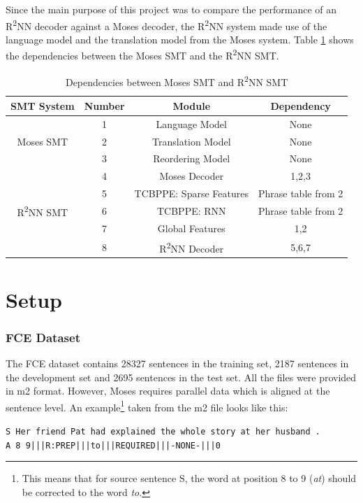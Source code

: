 \documentclass[12pt,a4paper,twoside]{report}
\begin{document}
Since the main purpose of this project was to compare the performance of an R\textsuperscript{2}NN decoder against a Moses decoder, the R\textsuperscript{2}NN system made use of the language model and the translation model from the Moses system. Table \ref{table:dependency} shows the dependencies between the Moses SMT and the R\textsuperscript{2}NN SMT.

\begin{table}[ht]
\centering
\vspace*{3mm}
\begin{tabular}{ c|c|c|c }
    \hline
    SMT System & Number & Module & Dependency \\
    \hline
    \multirow{3}{3em}{Moses SMT} & 1 & Language Model & None \\
    & 2 & Translation Model & None \\
    & 3 & Reordering Model & None \\
    & 4 & Moses Decoder & 1,2,3 \\
    \hline
    \multirow{3}{3em}{R\textsuperscript{2}NN SMT} & 5 & TCBPPE: Sparse Features & Phrase table from 2 \\
    & 6 & TCBPPE: RNN & Phrase table from 2 \\
    & 7 & Global Features & 1,2 \\
    & 8 & R\textsuperscript{2}NN Decoder & 5,6,7 \\
    \hline
\end{tabular}
\caption{Dependencies between Moses SMT and R\textsuperscript{2}NN SMT}
\label{table:dependency}
\end{table}


\section{Setup}\label{section:setup}

\subsubsection{FCE Dataset}

The FCE dataset contains 28327 sentences in the training set, 2187 sentences in the development set and 2695 sentences in the test set. All the files were provided in m2 format. However, Moses requires parallel data which is aligned at the sentence level. An example\footnote{This means that for source sentence S, the word at position 8 to 9 (\textit{at}) should be corrected to the word \textit{to}.} taken from the m2 file looks like this:
\begin{center}
    \texttt{S Her friend Pat had explained the whole story at her husband .}\\
    \texttt{A 8 9|||R:PREP|||to|||REQUIRED|||-NONE-|||0}
\end{center}
\end{document}
